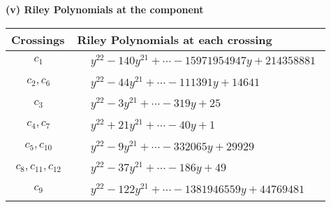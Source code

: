 \documentclass[1p]{elsarticle_modified}
\theoremstyle{definition}
\begin{document}
\flushleft \textbf{(v) Riley Polynomials at the component}\newline \\
\begin{tabular}{m{50pt}|m{274pt}}
Crossings & \hspace{64pt}Riley Polynomials at each crossing \\
\hline $$\begin{aligned}c_{1}\end{aligned}$$&$\begin{aligned}
&y^{22}-140 y^{21}+\cdots-15971954947 y+214358881
\end{aligned}$\\
\hline $$\begin{aligned}c_{2},c_{6}\end{aligned}$$&$\begin{aligned}
&y^{22}-44 y^{21}+\cdots-111391 y+14641
\end{aligned}$\\
\hline $$\begin{aligned}c_{3}\end{aligned}$$&$\begin{aligned}
&y^{22}-3 y^{21}+\cdots-319 y+25
\end{aligned}$\\
\hline $$\begin{aligned}c_{4},c_{7}\end{aligned}$$&$\begin{aligned}
&y^{22}+21 y^{21}+\cdots-40 y+1
\end{aligned}$\\
\hline $$\begin{aligned}c_{5},c_{10}\end{aligned}$$&$\begin{aligned}
&y^{22}-9 y^{21}+\cdots-332065 y+29929
\end{aligned}$\\
\hline $$\begin{aligned}c_{8},c_{11},c_{12}\end{aligned}$$&$\begin{aligned}
&y^{22}-37 y^{21}+\cdots-186 y+49
\end{aligned}$\\
\hline $$\begin{aligned}c_{9}\end{aligned}$$&$\begin{aligned}
&y^{22}-122 y^{21}+\cdots-1381946559 y+44769481
\end{aligned}$\\
\hline
\end{tabular}\\~\\
\end{document}
